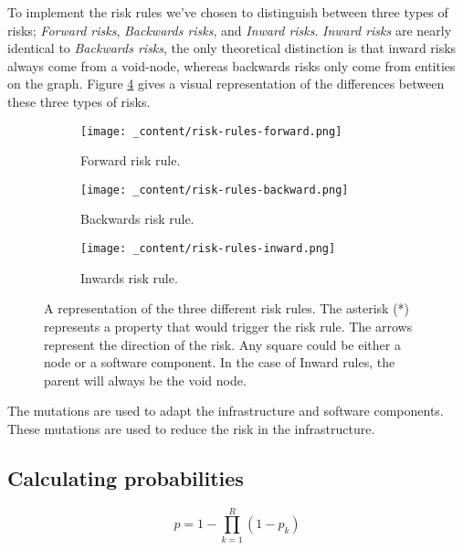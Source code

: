 To implement the risk rules we've chosen to distinguish between three types of risks; \emph{Forward risks}, \emph{Backwards risks}, and \emph{Inward risks}. \emph{Inward risks} are nearly identical to \emph{Backwards risks}, the only theoretical distinction is that inward risks always come from a void-node, whereas backwards risks only come from entities on the graph. Figure \ref{fig:risk-rules} gives a visual representation of the differences between these three types of risks.

\begin{figure}[H]
    \begin{subfigure}[b]{0.3\textwidth}
        \centering
        \texttt{[image: \_content/risk-rules-forward.png]}
        \caption{Forward risk rule.}
        \label{fig:risk-rule-forward}
    \end{subfigure}
    \begin{subfigure}[b]{0.3\textwidth}
        \centering
        \texttt{[image: \_content/risk-rules-backward.png]}
        \caption{Backwards risk rule.}
        \label{fig:risk-rule-backward}
    \end{subfigure}
    \begin{subfigure}[b]{0.3\textwidth}
        \centering
        \texttt{[image: \_content/risk-rules-inward.png]}
        \caption{Inwards risk rule.}
        \label{fig:risk-rule-inward}
    \end{subfigure}
    \caption{A representation of the three different risk rules. The asterisk (*) represents a property that would trigger the risk rule. The arrows represent the direction of the risk. Any square could be either a node or a software component. In the case of Inward rules, the parent will always be the void node.}
    \label{fig:risk-rules}
\end{figure}


The mutations are used to adapt the infrastructure and software components. These mutations are used to reduce the risk in the infrastructure.


\subsection{Calculating probabilities}
\label{ssec:calculating-probabilities}

\[p = 1 - \prod_{k=1}^{R}(1-p_{k}) \]


